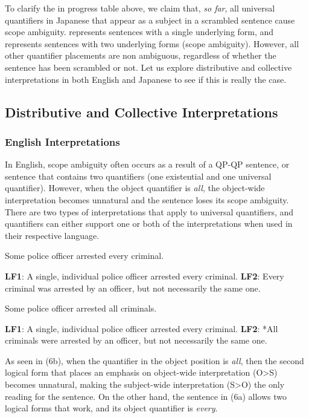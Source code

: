 \documentclass[english, 11pt]{article}
\newcommand{\onemeaning}{\text{\ding{172}}}
\newcommand{\twomeaning}{\text{\ding{173}}}
\begin{document}
\newline \newline
To clarify the in progress table above, we claim that, \emph{so far}, all universal quantifiers in Japanese that appear as a subject in a scrambled sentence cause scope ambiguity. \text{\onemeaning} represents sentences with a single underlying form, and \text{\twomeaning} represents sentences with two underlying forms (scope ambiguity). However, all other quantifier placements are non ambiguous, regardless of whether the sentence has been scrambled or not. Let us explore distributive and collective interpretations in both English and Japanese to see if this is really the case.

\subsection{Distributive and Collective Interpretations}
\subsubsection{English Interpretations}
In English, scope ambiguity often occurs as a result of a QP-QP sentence, or sentence that contains two quantifiers (one existential and one universal quantifier). However, when the object quantifier is \emph{all}, the object-wide interpretation becomes unnatural and the sentence loses its scope ambiguity. There are two types of interpretations that apply to universal quantifiers, and quantifiers can either support one or both of the interpretations when used in their respective language.
\begin {exe}
	\ex 
		\begin {xlist}
			\ex Some police officer arrested every criminal.
			\begin {xlist} 
				\ex \textbf{LF1}: A single, individual police officer arrested every criminal.
				\ex \textbf{LF2}: Every criminal was arrested by an officer, but not necessarily the same one.
			\end {xlist}
			\ex Some police officer arrested all criminals.
				\begin {xlist} 
					\ex \textbf{LF1}: A single, individual police officer arrested every criminal.
					\ex \textbf{LF2}: *All criminals were arrested by an officer, but not necessarily the same one.
				\end {xlist}
	\end {xlist}
\end {exe}
As seen in (6b), when the quantifier in the object position is \emph{all}, then the second logical form that places an emphasis on object-wide interpretation (O>S) becomes unnatural, making the subject-wide interpretation (S>O) the only reading for the sentence. On the other hand, the sentence in (6a) allows two logical forms that work, and its object quantifier is \emph{every}. 
\end{document}
